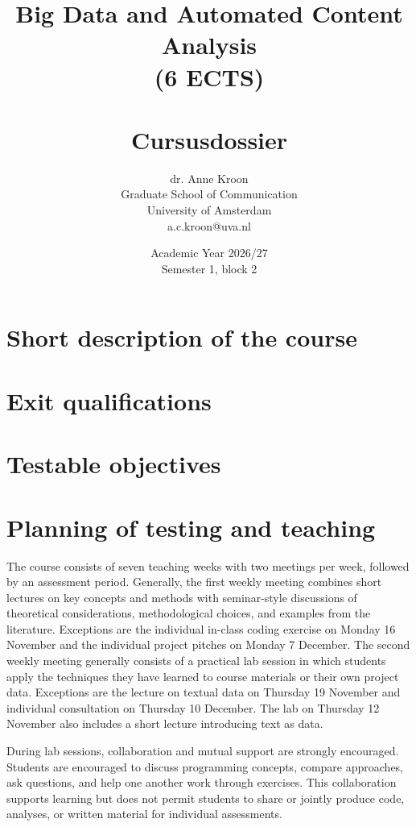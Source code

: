 \documentclass[a4paper,12pt]{report}
\title{Big Data and Automated Content Analysis\\ (6 ECTS)\\~\\Cursusdossier}
\author{
    dr. Anne Kroon\\
    Graduate School of Communication\\
    University of Amsterdam\\
    a.c.kroon@uva.nl
}
\date{Academic Year 2026/27\\Semester 1, block 2}
\begin{document}
\maketitle

\tableofcontents

\chapter{Short description of the course}


\chapter{Exit qualifications}


\chapter{Testable objectives}


\chapter{Planning of testing and teaching}

The course consists of seven teaching weeks with two meetings per week, followed by an assessment period. Generally, the first weekly meeting combines short lectures on key concepts and methods with seminar-style discussions of theoretical considerations, methodological choices, and examples from the literature. Exceptions are the individual in-class coding exercise on Monday 16 November and the individual project pitches on Monday 7 December. The second weekly meeting generally consists of a practical lab session in which students apply the techniques they have learned to course materials or their own project data. Exceptions are the lecture on textual data on Thursday 19 November and individual consultation on Thursday 10 December. The lab on Thursday 12 November also includes a short lecture introducing text as data.

During lab sessions, collaboration and mutual support are strongly encouraged. Students are encouraged to discuss programming concepts, compare approaches, ask questions, and help one another work through exercises. This collaboration supports learning but does not permit students to share or jointly produce code, analyses, or written material for individual assessments.
\end{document}
